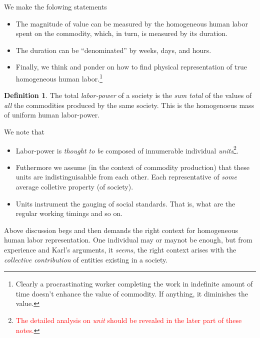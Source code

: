 \documentclass[12pt]{extarticle}
\theoremstyle{definition}
\newtheorem{definition}{Definition}[section]
\newenvironment{remark}[1][Remark]{\begin{trivlist}
\item[\hskip \labelsep {\bfseries #1}]}{\end{trivlist}}
\begin{document}
      \begin{remark}
        We make the folowing statements
        \begin{itemize}
        \item The magnitude of value can be measured by the homogeneous human labor spent on the commodity, which, in turn, is measured by its duration.
        \item The duration can be ``denominated'' by weeks, days, and hours.
          \item Finally, we think and ponder on how to find physical representation of true homogeneous human labor.\footnote{Clearly a procrastinating worker completing the work in indefinite amount of time doesn't enhance the value of commodity.  If anything, it diminishes the value.}  
          \end{itemize} 
        \end{remark}

        \begin{definition}
          The total \emph{labor-power} of a society is the \emph{sum total} of the values of \emph{all} the commodities produced by the same society.  This is the homogenoeus mass of uniform human labor-power.
        \end{definition}

        \begin{remark}
          We note that
          \begin{itemize}
          \item Labor-power is \emph{thought to be} composed of innumerable individual \emph{units}\footnote{\textcolor{red}{The detailed analysis on \emph{unit} should be revealed in the later part of these notes.}}.
            \item Futhermore we assume (in the context of commodity production) that these units are indistinguisahble from each other.  Each representative of \emph{some} average colletive property (of society).
            \item Units instrument the gauging of social standards.  That is, what are the regular working timings and so on.
          \end{itemize}
        \end{remark}
        
        Above discussion begs and then demands the right context for homogeneous human labor representation.  One individual may or maynot be enough, but from experience and Karl's arguments, it \emph{seems}, the right context arises with the \emph{collective contribution} of entities existing in a society.
\end{document}

